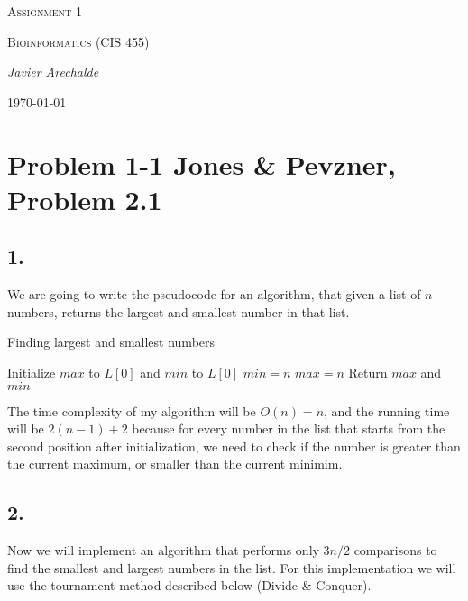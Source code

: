 \documentclass{article}
\begin{document}
\begin{titlepage}
	\centering
	{\scshape\LARGE Assignment 1\par}
	\vspace{1cm}
	{\scshape\Large Bioinformatics (CIS 455)\par}
	\vspace{1.5cm}
	{\Large\itshape Javier Arechalde\par}
	\vfill
	{\large \today\par}
\end{titlepage}

\section*{Problem 1-1 Jones \& Pevzner, Problem 2.1}
  
\subsection*{1.}

We are going to write the pseudocode for an algorithm, that given a list of $n$ numbers, returns the largest and smallest number in that list.

\begin{algorithm}[H]
\caption{Finding largest and smallest numbers}
\begin{algorithmic}[1]
\State Initialize $max$ to $L[0]$ and $min$ to $L[0]$
  \State $min = n$
 \EndIf 
  \State $max = n$
 \EndIf
\EndFor
\State Return $max$ and $min$
\end{algorithmic}
\end{algorithm}

The time complexity of my algorithm will be $O(n) = n$, and the running time will be $2(n-1)+2$ because for every number in the list that starts from the second position after initialization, we need to check if the number is greater than the current maximum, or smaller than the current minimim.

\subsection*{2.}

Now we will implement an algorithm that performs only $3n/2$ comparisons to find the smallest and largest numbers in the list. For this implementation we will use the tournament method described below (Divide \& Conquer).
\end{document}
